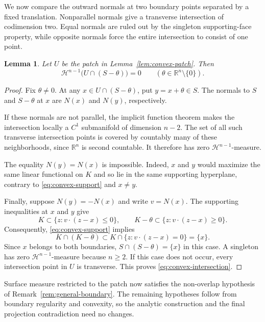 \documentclass[a4paper,12pt,reqno]{amsart}
\newcommand{\lead}[1]{\par\smallskip\noindent\leavevmode#1\par\smallskip}
\newtheorem{lemma}[theorem]{Lemma}
\theoremstyle{remark}
\numberwithin{equation}{section}
\newcommand{\R}{\mathbb R}
\begin{document}
\lead{We now compare the outward normals at two boundary points separated
by a fixed translation. Nonparallel normals give a transverse
intersection of codimension two. Equal normals are ruled out by the
singleton supporting-face property, while opposite normals force the
entire intersection to consist of one point.}

\begin{lemma}\label{lem:convex-translates}
Let $U$ be the patch in Lemma~\ref{lem:convex-patch}. Then
\begin{equation}\label{eq:convex-intersection}
 \mathcal H^{n-1}\bigl(U\cap(S-\theta)\bigr)=0
 \qquad(\theta\in\R^n\setminus\{0\}).
\end{equation}
\end{lemma}

\begin{proof}
Fix $\theta\ne0$. At any $x\in U\cap(S-\theta)$, put $y=x+\theta\in S$.
The normals to $S$ and $S-\theta$ at $x$ are $N(x)$ and $N(y)$,
respectively.

If these normals are not parallel, the implicit function theorem makes
the intersection locally a $C^1$ submanifold of dimension $n-2$.
The set of all such transverse intersection points is covered by
countably many of these neighborhoods, since $\R^n$ is second countable.
It therefore has zero $\mathcal H^{n-1}$-measure.

The equality $N(y)=N(x)$ is impossible. Indeed, $x$ and $y$ would
maximize the same linear functional on $K$ and so lie in the same
supporting hyperplane, contrary to \eqref{eq:convex-support} and $x\ne y$.

Finally, suppose $N(y)=-N(x)$ and write $v=N(x)$. The supporting
inequalities at $x$ and $y$ give
\[
 K\subset\{z:v\cdot(z-x)\leq0\},\qquad
 K-\theta\subset\{z:v\cdot(z-x)\geq0\}.
\]
Consequently, \eqref{eq:convex-support} implies
\[
 K\cap(K-\theta)
 \subset K\cap\{z:v\cdot(z-x)=0\}
 =\{x\}.
\]
Since $x$ belongs to both boundaries, $S\cap(S-\theta)=\{x\}$ in this
case. A singleton has zero $\mathcal H^{n-1}$-measure because $n\geq2$.
If this case does not occur, every intersection point in $U$ is
transverse. This proves \eqref{eq:convex-intersection}.
\end{proof}

\lead{Surface measure restricted to the patch now satisfies the
non-overlap hypothesis of Remark~\ref{rem:general-boundary}. The remaining
hypotheses follow from boundary regularity and convexity, so the analytic
construction and the final projection contradiction need no changes.}
\end{document}
